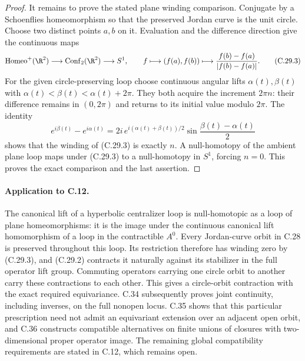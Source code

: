 \begin{proof}
It remains to prove the stated plane winding comparison. Conjugate
by a Schoenflies homeomorphism so that the preserved Jordan curve is
the unit circle. Choose two distinct points $a,b$ on it. Evaluation
and the difference direction give the continuous maps
\[
 \operatorname{Homeo}^+(\R^2)
 \longrightarrow\operatorname{Conf}_2(\R^2)
 \longrightarrow S^1,
 \qquad
 f\longmapsto(f(a),f(b))
 \longmapsto\frac{f(b)-f(a)}{|f(b)-f(a)|}.                 \tag{C.29.3}
\]
For the given circle-preserving loop choose continuous angular lifts
$\alpha(t),\beta(t)$ with
$\alpha(t)<\beta(t)<\alpha(t)+2\pi$.
They both acquire the increment $2\pi n$: their difference remains
in $(0,2\pi)$ and returns to its initial value modulo $2\pi$.
The identity
\[
 e^{i\beta(t)}-e^{i\alpha(t)}
 =2i\,e^{i(\alpha(t)+\beta(t))/2}
            \sin\frac{\beta(t)-\alpha(t)}2
\]
shows that the winding of (C.29.3) is exactly $n$.
A null-homotopy of the ambient plane loop maps under (C.29.3) to a
null-homotopy in $S^1$, forcing $n=0$. This proves the exact
comparison and the last assertion.
\end{proof}

\paragraph{Application to C.12.}
The canonical lift of a hyperbolic centralizer loop is null-homotopic
as a loop of plane homeomorphisms: it is the image under the continuous
canonical lift homomorphism of a loop in the contractible $A^0$.
Every Jordan-curve orbit in C.28 is preserved throughout this loop.
Its restriction therefore has winding zero by (C.29.3), and (C.29.2)
contracts it naturally against its stabilizer in the full operator
lift group. Commuting operators carrying one circle orbit to another
carry these contractions to each other. This gives a circle-orbit
contraction with the exact required equivariance. C.34 subsequently
proves joint continuity, including inverses, on the full nonopen
locus. C.35 shows that this particular prescription need not admit
an equivariant extension over an adjacent open orbit, and C.36
constructs compatible alternatives on finite unions of closures
with two-dimensional proper operator image. The remaining global
compatibility requirements are stated in C.12, which remains open.
